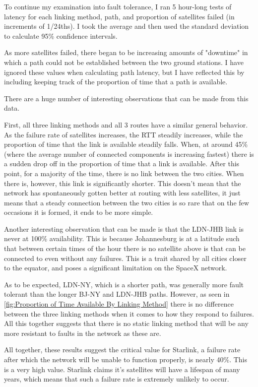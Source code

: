 \documentclass[12pt,a4paper,twoside,openright]{report}
\begin{document}
To continue my examination into fault tolerance, I ran 5 hour-long tests of latency for each linking method, path, and proportion of satellites failed (in increments of 1/24ths). I took the average and then used the standard deviation to calculate 95\% confidence intervals. 

As more satellites failed, there began to be increasing amounts of "downtime" in which a path could not be established between the two ground stations. I have ignored these values when calculating path latency, but I have reflected this by including keeping track of the proportion of time that a path is available.

There are a huge number of interesting observations that can be made from this data.

First, all three linking methods and all 3 routes have a similar general behavior. As the failure rate of satellites increases, the RTT steadily increases, while the proportion of time that the link is available steadily falls. When, at around 45\% (where the average number of connected components is increasing fastest) there is a sudden drop off in the proportion of time that a link is available. After this point, for a majority of the time, there is no link between the two cities. When there is, however, this link is significantly shorter. This doesn't mean that the network has spontaneously gotten better at routing with less satellites, it just means that a steady connection between the two cities is so rare that on the few occasions it is formed, it ends to be more simple.

Another interesting observation that can be made is that the LDN-JHB link is never at 100\% availability. This is because Johannesburg is at a latitude such that between certain times of the hour there is no satellite above is that can be connected to even without any failures. This is a trait shared by all cities closer to the equator, and poses a significant limitation on the SpaceX network.

As to be expected, LDN-NY, which is a shorter path, was generally more fault tolerant than the longer BJ-NY and LDN-JHB paths. However, as seen in \ref{fig:Proportion of Time Available By Linking Method} there is no difference between the three linking methods when it comes to how they respond to failures. All this together suggests that there is no static linking method that will be any more resistant to faults in the network as these are.

All together, these results suggest the critical value for Starlink, a failure rate after which the network will be unable to function properly, is nearly 40\%. This is a very high value. Starlink claims it's satellites will have a lifespan of many years, which means that such a failure rate is extremely unlikely to occur. 
\end{document}
